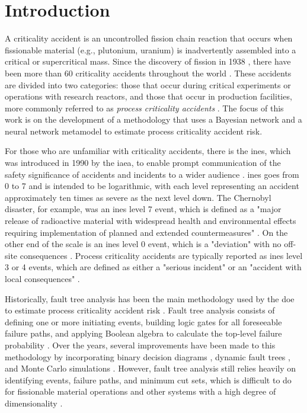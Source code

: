 
\chapter{Introduction}

A criticality accident is an uncontrolled fission chain reaction that occurs when fissionable material (e.g., plutonium, uranium) is inadvertently assembled into a critical or supercritical mass.
Since the discovery of fission in 1938 \cite{hahn}, there have been more than 60 criticality accidents throughout the world \cite{mclaughlin}.
These accidents are divided into two categories: those that occur during critical experiments or operations with research reactors, and those that occur in production facilities, more commonly referred to as \textit{process criticality accidents} \cite{mclaughlin}.
The focus of this work is on the development of a methodology that uses a Bayesian network and a neural network metamodel to estimate process criticality accident risk.

For those who are unfamiliar with criticality accidents, there is the \gls{ines}, which was introduced in 1990 by the \gls{iaea}, to enable prompt communication of the safety significance of accidents and incidents to a wider audience \cite{ines}.
\gls{ines} goes from 0 to 7 and is intended to be logarithmic, with each level representing an accident approximately ten times as severe as the next level down.
The Chernobyl disaster, for example, was an \gls{ines} level 7 event, which is defined as a "major release of radioactive material with widespread health and environmental effects requiring implementation of planned and extended countermeasures" \cite{ines}.
On the other end of the scale is an \gls{ines} level 0 event, which is a "deviation" with no off-site consequences \cite{ines}.
Process criticality accidents are typically reported as \gls{ines} level 3 or 4 events, which are defined as either a "serious incident" or an "accident with local consequences" \cite{ines,kermisch}.

Historically, fault tree analysis has been the main methodology used by the \gls{doe} to estimate process criticality accident risk \cite{doe2013}.
Fault tree analysis consists of defining one or more initiating events, building logic gates for all foreseeable failure paths, and applying Boolean algebra to calculate the top-level failure probability \cite{roberts}.
Over the years, several improvements have been made to this methodology by incorporating binary decision diagrams \cite{reay,remenyte}, dynamic fault trees \cite{cepin,ruijters}, and Monte Carlo simulations \cite{rao}.
However, fault tree analysis still relies heavily on identifying events, failure paths, and minimum cut sets, which is difficult to do for fissionable material operations and other systems with a high degree of dimensionality \cite{au,cadini2016,khakzad}.

